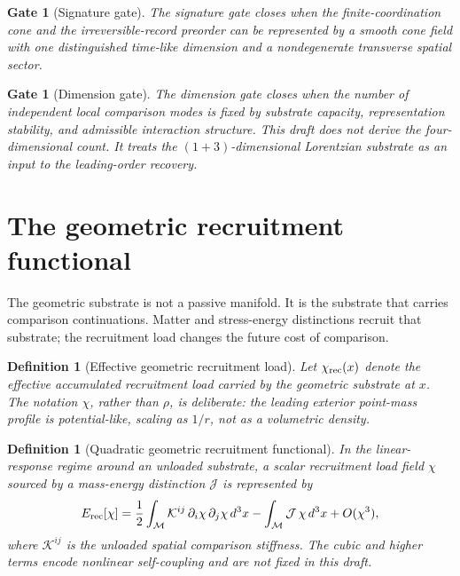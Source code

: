 \documentclass[11pt]{article}
\newtheorem{definition}[theorem]{Definition}
\newtheorem{gate}[theorem]{Gate}
\theoremstyle{remark}
\newcommand{\Erec}{E_{\rm rec}}
\newcommand{\Kgeom}{\mathcal K}
\newcommand{\Mgeom}{\mathcal M}
\newcommand{\Jsrc}{\mathcal J}
\begin{document}
\begin{gate}[Signature gate]
The signature gate closes when the finite-coordination cone and the irreversible-record preorder can be represented by a smooth cone field with one distinguished time-like dimension and a nondegenerate transverse spatial sector.
\end{gate}

\begin{gate}[Dimension gate]
The dimension gate closes when the number of independent local comparison modes is fixed by substrate capacity, representation stability, and admissible interaction structure.  This draft does not derive the four-dimensional count.  It treats the \((1+3)\)-dimensional Lorentzian substrate as an input to the leading-order recovery.
\end{gate}

\section{The geometric recruitment functional}

The geometric substrate is not a passive manifold.  It is the substrate that carries comparison continuations.  Matter and stress-energy distinctions recruit that substrate; the recruitment load changes the future cost of comparison.

\begin{definition}[Effective geometric recruitment load]
Let \(\chi_{\rm rec}(x)\) denote the effective accumulated recruitment load carried by the geometric substrate at \(x\).  The notation \(\chi\), rather than \(\rho\), is deliberate: the leading exterior point-mass profile is potential-like, scaling as \(1/r\), not as a volumetric density.
\end{definition}

\begin{definition}[Quadratic geometric recruitment functional]
In the linear-response regime around an unloaded substrate, a scalar recruitment load field \(\chi\) sourced by a mass-energy distinction \(\Jsrc\) is represented by
\[
        \Erec[\chi]
        =
        \frac12\int_{\Mgeom} \Kgeom^{ij}\,\partial_i\chi\,\partial_j\chi\,d^3x
        -
        \int_{\Mgeom} \Jsrc\,\chi\,d^3x
        + O(\chi^3),
\]
where \(\Kgeom^{ij}\) is the unloaded spatial comparison stiffness.  The cubic and higher terms encode nonlinear self-coupling and are not fixed in this draft.
\end{definition}
\end{document}
